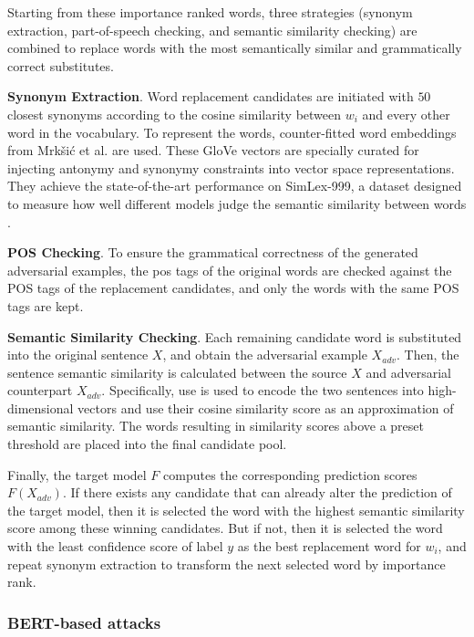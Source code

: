 Starting from these importance ranked words, three strategies (synonym extraction, part-of-speech checking, and semantic similarity checking) are combined to replace words with the most semantically similar and grammatically correct substitutes.

\textbf{Synonym Extraction}.
Word replacement candidates are initiated with $50$ closest synonyms according to the cosine similarity between $w_i$ and every other word in the vocabulary.
To represent the words, counter-fitted word embeddings from Mrkšić et al. \cite{conf/naacl/MrksicSTGRSVWY16} are used.
These GloVe vectors are specially curated for injecting antonymy and synonymy constraints into vector space representations. They achieve the state-of-the-art performance on SimLex-999, a dataset designed to measure how well different models judge the semantic similarity between words \cite{hill2014simlex999}.


\textbf{POS Checking}.
To ensure the grammatical correctness of the generated adversarial examples, the \acrfull{pos} tags of the original words are checked against the POS tags of the replacement candidates, and only the words with the same POS tags are kept.

\textbf{Semantic Similarity Checking}.
Each remaining candidate word is substituted into the original sentence $X$, and obtain the adversarial example $X_{adv}$. Then, the sentence semantic similarity is calculated between the source $X$ and adversarial counterpart $X_{adv}$. Specifically, \acrfull{use} \cite{journals/corr/abs-1803-11175} is used to encode the two sentences into high-dimensional vectors and use their cosine similarity score as an approximation of semantic similarity. The words resulting in similarity scores above a preset threshold are placed into the final candidate pool.

Finally, the target model $F$ computes the corresponding prediction scores $F(X_{adv})$.
If there exists any candidate that can already alter the prediction of the target model, then it is selected the word with the highest semantic similarity score among these winning candidates. 
But if not, then it is selected the word with the least confidence score of label $y$ as the best replacement word for $w_i$, and repeat synonym extraction to transform the next selected word by importance rank.

\subsubsection{BERT-based attacks}\label{subsubsec:bert-based-attacks}

